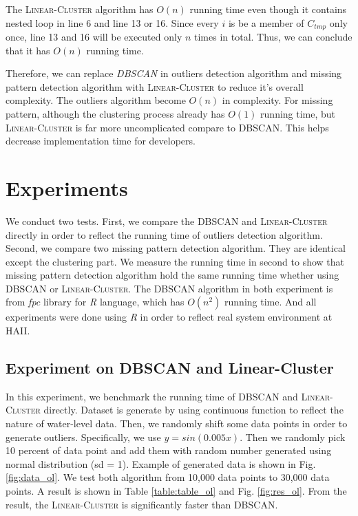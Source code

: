 \documentclass[conference]{IEEEtran}
\begin{document}
The \textsc{Linear-Cluster} algorithm has $O(n)$ running time even though it contains nested loop in line 6 and line 13 or 16. Since every $i$ is be a member of $C_{tmp}$ only once, line 13 and 16 will be executed only $n$ times in total. Thus, we can conclude that it has $O(n)$ running time.

Therefore, we can replace \textit{DBSCAN} in outliers detection algorithm and missing pattern detection algorithm with \textsc{Linear-Cluster} to reduce it's overall complexity. The outliers algorithm become $O(n)$ in complexity. For missing pattern, although the clustering process already has $O(1)$ running time, but \textsc{Linear-Cluster} is far more uncomplicated compare to \textsc{DBSCAN}. This helps decrease implementation time for developers.


\section{Experiments} \label{sec:xperiments}

We conduct two tests. First, we compare the \textsc{DBSCAN} and \textsc{Linear-Cluster} directly in order to reflect the running time of outliers detection algorithm. Second, we compare two missing pattern detection algorithm. They are identical except the clustering part. We measure the running time in second to show that missing pattern detection algorithm hold the same running time whether using \textsc{DBSCAN} or \textsc{Linear-Cluster}. The \textsc{DBSCAN} algorithm in both experiment is from \textit{fpc} library \cite{christianhennig2014} for \textit{R} language, which has $O(n^2)$ running time. And all experiments were done using \textit{R} in order to reflect real system environment at HAII.

\subsection{Experiment on DBSCAN and Linear-Cluster}

  In this experiment, we benchmark the running time of \textsc{DBSCAN} and \textsc{Linear-Cluster} directly. Dataset is generate by using continuous function to reflect the nature of water-level data. Then, we randomly shift some data points in order to generate outliers. Specifically, we use $y = sin(0.005x)$. Then we randomly pick 10 percent of data point and add them with random number generated using normal distribution (sd = 1). Example of generated data is shown in Fig. \ref{fig:data_ol}. We test both algorithm from 10,000 data points to 30,000 data points. A result is shown in Table \ref{table:table_ol} and Fig. \ref{fig:res_ol}. From the result, the \textsc{Linear-Cluster} is significantly faster than \textsc{DBSCAN}.
  
\end{document}
